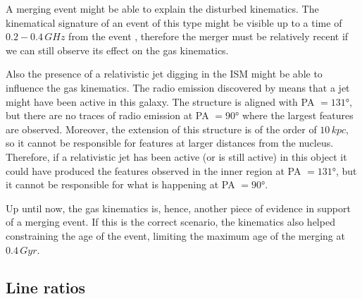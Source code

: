 \documentclass[../main.tex]{subfiles}
\begin{document}
A merging event might be able to explain the disturbed kinematics.
The kinematical signature of an event of this type might be visible up to a time of $0.2-0.4\,\si{GHz}$ from the event \citep{Hung16}, therefore the merger must be relatively recent if we can still observe its effect on the gas kinematics.

Also the presence of a relativistic jet digging in the ISM might be able to influence the gas kinematics.
The radio emission discovered by \citet{Congiu17} means that a jet might have been active in this galaxy.
The structure is aligned with PA $=\ang{131}$, but there are no traces of radio emission at PA $=\ang{90}$ where the largest features are observed.
Moreover, the extension of this structure is of the order of $10\,\si{kpc}$, so it cannot be responsible for features at larger distances from the nucleus.
Therefore, if a relativistic jet has been active (or is still active) in this object it could have produced the features observed in the inner region at PA $=\ang{131}$, but it cannot be responsible for what is happening at PA $=\ang{90}$.

Up until now, the gas kinematics is, hence, another piece of evidence in support of a merging event.
If this is the correct scenario, the kinematics also helped constraining the age of the event, limiting the maximum age of the merging at $0.4\,\si{Gyr}$.


\subsection{Line ratios}
\label{sec:pap3_lineratios}
\end{document}
